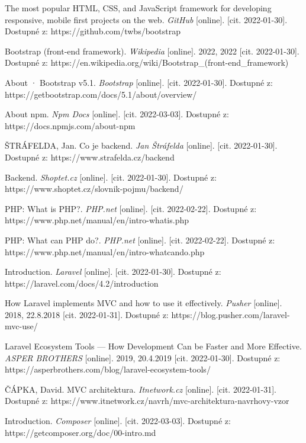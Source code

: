 \begin{thebibliography}{55}
The most popular HTML, CSS, and JavaScript framework for developing responsive, mobile first projects on the web. \textit{GitHub} [online]. [cit. 2022-01-30]. Dostupné z: https://github.com/twbs/bootstrap

Bootstrap (front-end framework). \textit{Wikipedia} [online]. 2022, 2022 [cit. 2022-01-30]. Dostupné z: https://en.wikipedia.org/wiki/Bootstrap\_(front-end\_framework)

About · Bootstrap v5.1. \textit{Bootstrap} [online]. [cit. 2022-01-30]. Dostupné z: https://getbootstrap.com/docs/5.1/about/overview/

About npm. \textit{Npm Docs} [online]. [cit. 2022-03-03]. Dostupné z: https://docs.npmjs.com/about-npm

ŠTRÁFELDA, Jan. Co je backend. \textit{Jan Štráfelda} [online]. [cit. 2022-01-30]. Dostupné z: https://www.strafelda.cz/backend

Backend. \textit{Shoptet.cz} [online]. [cit. 2022-01-30]. Dostupné z: https://www.shoptet.cz/slovnik-pojmu/backend/

PHP: What is PHP?. \textit{PHP.net} [online]. [cit. 2022-02-22]. Dostupné z: https://www.php.net/manual/en/intro-whatis.php

PHP: What can PHP do?. \textit{PHP.net} [online]. [cit. 2022-02-22]. Dostupné z: https://www.php.net/manual/en/intro-whatcando.php

Introduction. \textit{Laravel} [online]. [cit. 2022-01-30]. Dostupné z: https://laravel.com/docs/4.2/introduction

How Laravel implements MVC and how to use it effectively. \textit{Pusher} [online]. 2018, 22.8.2018 [cit. 2022-01-31]. Dostupné z: https://blog.pusher.com/laravel-mvc-use/

Laravel Ecosystem Tools --- How Development Can be Faster and More Effective. \textit{ASPER BROTHERS} [online]. 2019, 20.4.2019 [cit. 2022-01-30]. Dostupné z: https://asperbrothers.com/blog/laravel-ecosystem-tools/

ČÁPKA, David. MVC architektura. \textit{Itnetwork.cz} [online]. [cit. 2022-01-31]. Dostupné z: https://www.itnetwork.cz/navrh/mvc-architektura-navrhovy-vzor

Introduction. \textit{Composer} [online]. [cit. 2022-03-03]. Dostupné z: https://getcomposer.org/doc/00-intro.md


\end{thebibliography}
